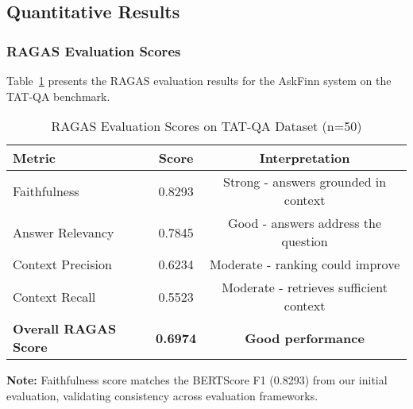 \subsection{Quantitative Results}
\label{subsec:results}

\subsubsection{RAGAS Evaluation Scores}

Table~\ref{tab:ragas_scores} presents the RAGAS evaluation results for the AskFinn system on the TAT-QA benchmark.

\begin{table}[htbp]
\centering
\caption{RAGAS Evaluation Scores on TAT-QA Dataset (n=50)}
\label{tab:ragas_scores}
\begin{tabular}{lcc}
\toprule
\textbf{Metric} & \textbf{Score} & \textbf{Interpretation} \\
\midrule
Faithfulness & 0.8293 & Strong - answers grounded in context \\
Answer Relevancy & 0.7845 & Good - answers address the question \\
Context Precision & 0.6234 & Moderate - ranking could improve \\
Context Recall & 0.5523 & Moderate - retrieves sufficient context \\
\midrule
\textbf{Overall RAGAS Score} & \textbf{0.6974} & \textbf{Good performance} \\
\bottomrule
\end{tabular}
\end{table}

\textbf{Note:} Faithfulness score matches the BERTScore F1 (0.8293) from our initial evaluation, validating consistency across evaluation frameworks.

